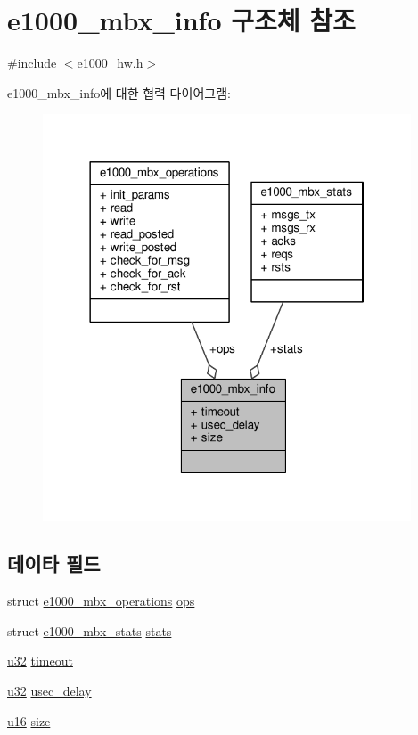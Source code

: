 \hypertarget{structe1000__mbx__info}{}\section{e1000\+\_\+mbx\+\_\+info 구조체 참조}
\label{structe1000__mbx__info}


{\ttfamily \#include $<$e1000\+\_\+hw.\+h$>$}



e1000\+\_\+mbx\+\_\+info에 대한 협력 다이어그램\+:
\nopagebreak
\begin{figure}[H]
\begin{center}
\leavevmode
\includegraphics[width=310pt]{structe1000__mbx__info__coll__graph}
\end{center}
\end{figure}
\subsection*{데이타 필드}
\begin{DoxyCompactItemize}
\item 
struct \hyperlink{structe1000__mbx__operations}{e1000\+\_\+mbx\+\_\+operations} \hyperlink{structe1000__mbx__info_a008cc1935ad11e1d606524f05e5d164b}{ops}
\item 
struct \hyperlink{structe1000__mbx__stats}{e1000\+\_\+mbx\+\_\+stats} \hyperlink{structe1000__mbx__info_a0896d773a3bcfce4ce1e9c43ba7e19a7}{stats}
\item 
\hyperlink{lib_2igb_2e1000__osdep_8h_a64e91c10a0d8fb627e92932050284264}{u32} \hyperlink{structe1000__mbx__info_aab0b8a4320e771becf663b000c2cd7e1}{timeout}
\item 
\hyperlink{lib_2igb_2e1000__osdep_8h_a64e91c10a0d8fb627e92932050284264}{u32} \hyperlink{structe1000__mbx__info_af53e869635e722745867234d465ee235}{usec\+\_\+delay}
\item 
\hyperlink{lib_2igb_2e1000__osdep_8h_acdc9cf0314be0ae5a01d6d4379a95edd}{u16} \hyperlink{structe1000__mbx__info_a156e4b9881ca413f29004c8138d78c55}{size}
\end{DoxyCompactItemize}


